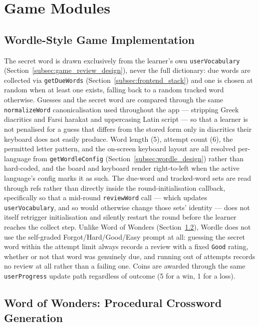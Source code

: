 \section{Game Modules}
\label{sec:game_modules_impl}
    \subsection{Wordle-Style Game Implementation}
    \label{subsec:wordle_impl}
    The secret word is drawn exclusively from the learner's own \texttt{userVocabulary} (Section~\ref{subsec:game_review_design}), never the full dictionary: due words are collected via \texttt{getDueWords} (Section~\ref{subsec:frontend_stack}) and one is chosen at random when at least one exists, falling back to a random tracked word otherwise. Guesses and the secret word are compared through the same \texttt{normalizeWord} canonicalisation used throughout the app --- stripping Greek diacritics and Farsi harakat and uppercasing Latin script --- so that a learner is not penalised for a guess that differs from the stored form only in diacritics their keyboard does not easily produce. Word length (5), attempt count (6), the permitted letter pattern, and the on-screen keyboard layout are all resolved per-language from \texttt{getWordleConfig} (Section~\ref{subsec:wordle_design}) rather than hard-coded, and the board and keyboard render right-to-left when the active language's config marks it as such. The due-word and tracked-word sets are read through refs rather than directly inside the round-initialisation callback, specifically so that a mid-round \texttt{reviewWord} call --- which updates \texttt{userVocabulary}, and so would otherwise change those sets' identity --- does not itself retrigger initialisation and silently restart the round before the learner reaches the collect step. Unlike Word of Wonders (Section~\ref{subsec:wow_impl}), Wordle does not use the self-graded Forgot/Hard/Good/Easy prompt at all: guessing the secret word within the attempt limit always records a review with a fixed \texttt{Good} rating, whether or not that word was genuinely due, and running out of attempts records no review at all rather than a failing one. Coins are awarded through the same \texttt{userProgress} update path regardless of outcome (5 for a win, 1 for a loss).

    \subsection{Word of Wonders: Procedural Crossword Generation}
    \label{subsec:wow_impl}
